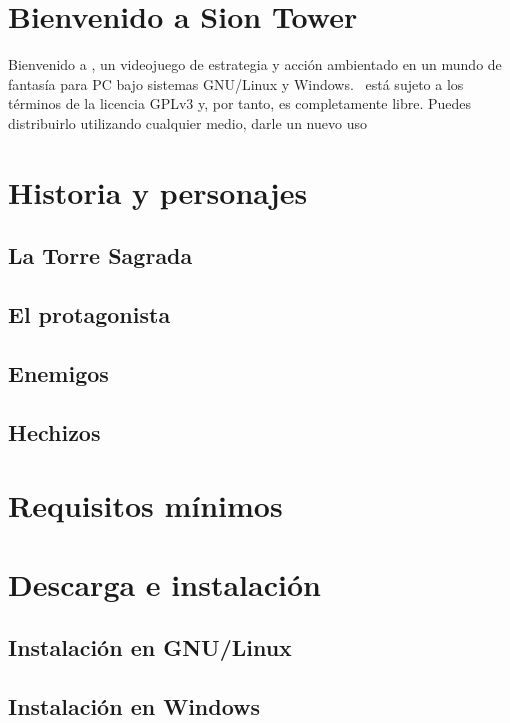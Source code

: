 \section*{Bienvenido a Sion Tower}

Bienvenido a \juego, un videojuego de estrategia y acción ambientado en un
mundo de fantasía para PC bajo sistemas GNU/Linux y Windows. \juego\ está
sujeto a los términos de la licencia GPLv3 y, por tanto, es completamente
libre. Puedes distribuirlo utilizando cualquier medio, darle un nuevo
uso \\


\section*{Historia y personajes}

\subsection*{La Torre Sagrada}

\subsection*{El protagonista}

\subsection*{Enemigos}

\subsection*{Hechizos}


\section*{Requisitos mínimos}



\section*{Descarga e instalación}

\subsection*{Instalación en GNU/Linux}

\subsection*{Instalación en Windows}



